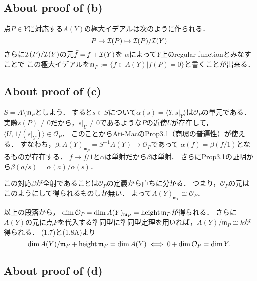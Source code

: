 \documentclass[a4paper]{jarticle}
\newcommand{\I}[1]{\mathfrak{#1}}
\begin{document}
    \subsection{About proof of (b)}
    点$P \in Y$に対応する$A(Y)$の極大イデアルは次のように作られる．
    \[ P \mapsto \mathcal{I}(P) \mapsto \mathcal{I}(P)/\mathcal{I}(Y) \]
    さらに$\mathcal{I}(P)/\mathcal{I}(Y)$の元$\bar{f}=f+\mathcal{I}(Y)$を
    $\alpha$によって$Y$上のregular functionとみなすことで
    この極大イデアルを$\I{m}_P:=\{f \in A(Y) | f(P)=0 \}$と書くことが出来る．

    \subsection{About proof of (c)}
    $S=A \setminus \I{m}_P$としよう．
    すると$s \in S$について$\alpha(s)=\langle Y,s|_{Y} \rangle$は$\mathcal{O}_P$の単元である．
    実際$s(P) \neq 0$だから，$s|_{U} \neq 0$であるような$P$の近傍$U$が存在して，
    $\langle U,1/(s|_{Y}) \rangle \in \mathcal{O}_P$．
    このことからAti-MacのProp3.1（商環の普遍性）が使える．
    すなわち，$\beta: A(Y)_{\I{m}_P}=S^{-1}A(Y) \to \mathcal{O}_P$であって
    $\alpha(f)=\beta(f/1)$となるものが存在する．
    $f \mapsto f/1$と$\alpha$は単射だから$\beta$は単射．
    さらにProp3.1の証明から$\beta(a/s)=\alpha(a)/\alpha(s)$．

    この対応$\beta$が全射であることは$\mathcal{O}_P$の定義から直ちに分かる．
    つまり，$\mathcal{O}_P$の元はこのようにして得られるものしか無い．
    よって$A(Y)_{\I{m}_P} \cong \mathcal{O}_P$．

    以上の段落から，
    $\dim \mathcal{O}_P=\dim A(Y)_{\I{m}_P}=\height \I{m}_P$が得られる．
    さらに$A(Y)$の元に点$P$を代入する準同型に準同型定理を用いれば，$A(Y)/\I{m}_P \cong k$が得られる．
    (1.7)と(1.8A)より
    \[ \dim A(Y)/\I{m}_P+\height \I{m}_P=\dim A(Y) \iff 0+\dim \mathcal{O}_P=\dim Y. \]

    \subsection{About proof of (d)}
\end{document}
